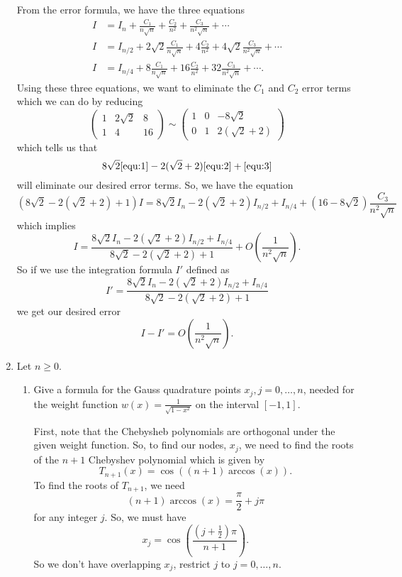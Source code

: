 \documentclass[a4paper,12pt]{article}
\newcommand{\pmat}[1]{\begin{pmatrix} #1 \end{pmatrix}}
\begin{document}
\begin{enumerate}[label = \arabic*.]
		From the error formula, we have the three equations
		\begin{align}
			I &= I_n  + \frac{C_1}{n \sqrt{n}} + \frac{C_2}{n^2} + \frac{C_3}{n^2\sqrt{n}} + \cdots \label{equ:1} \\
			I &= I_{n / 2}  + 2\sqrt{2} \frac{C_1}{n \sqrt{n}} + 4\frac{C_2}{n^2} + 4\sqrt{2}\frac{C_3}{n^2\sqrt{n}} + \cdots \label{equ:2} \\
			I &= I_{n / 4}  + 8\frac{C_1}{n \sqrt{n}} + 16\frac{C_2}{n^2} + 32\frac{C_3}{n^2\sqrt{n}} + \cdots. \label{equ:3}
		\end{align}
		Using these three equations, we want to eliminate the $ C_1 $ and $ C_2 $ error terms which we can do by reducing
		\[
			\pmat{1 & 2\sqrt{2} & 8 \\ 1 & 4 & 16} \sim \pmat{1 & 0 & -8\sqrt{2} \\ 0 & 1 & 2(\sqrt{2} + 2)}
		\]
		which tells us that 
		\[
			8\sqrt{2}\eqref{equ:1} - 2(\sqrt{2} + 2)\eqref{equ:2} + \eqref{equ:3}
		\] 
		will eliminate our desired error terms. So, we have the equation
		\[
			(8\sqrt{2} - 2(\sqrt{2} + 2) + 1) I = 8\sqrt{2}I_n - 2(\sqrt{2} + 2)I_{n/2} + I_{n/4} + (16 - 8\sqrt{2})\frac{C_3}{n^2 \sqrt{n}}
		\]
		which implies
		\[
			I = \frac{8\sqrt{2}I_n - 2(\sqrt{2} + 2)I_{n/2} + I_{n/4}}{8\sqrt{2} - 2(\sqrt{2} + 2) + 1} + O\left(\frac{1}{n^2\sqrt{n}}\right).
		\]
		So if we use the integration formula $ I' $ defined as
		\[
			\boxed{I' = \frac{8\sqrt{2}I_n - 2(\sqrt{2} + 2)I_{n/2} + I_{n/4}}{8\sqrt{2} - 2(\sqrt{2} + 2) + 1}}
		\]
		we get our desired error
		\[
			\boxed{I - I' = O\left(\frac{1}{n^2\sqrt{n}}\right)}.
		\]
		
		\newpage
		\item
			Let $ n \geq 0 $.
			\begin{enumerate}[label = (\roman*)]
				\item Give a formula for the Gauss quadrature points $ x_j, j = 0, \ldots, n $, needed for the weight function $ w(x) = \frac{1}{\sqrt{1 - x^2}} $ on the interval $ [-1, 1] $.
				
				First, note that the Chebysheb polynomials are orthogonal under the given weight function. So, to find our nodes, $ x_j $, we need to find the roots of the $ n + 1 $ Chebyshev polynomial which is given by 
				\[
					T_{n + 1} (x) = \cos((n + 1)\arccos(x)).
				\]
				To find the roots of $ T_{n + 1} $, we need
				\[
					(n + 1) \arccos(x) = \frac{\pi}{2} + j \pi
				\]
				for any integer $ j $. So, we must have
				\[
					\boxed{x_j = \cos\left(\frac{\left(j + \frac{1}{2}\right)\pi}{n + 1}\right).}
				\]
				So we don't have overlapping $ x_j $, restrict $ j $ to $ j = 0, \ldots, n $.
				

\end{enumerate}
\end{enumerate}
\end{document}
